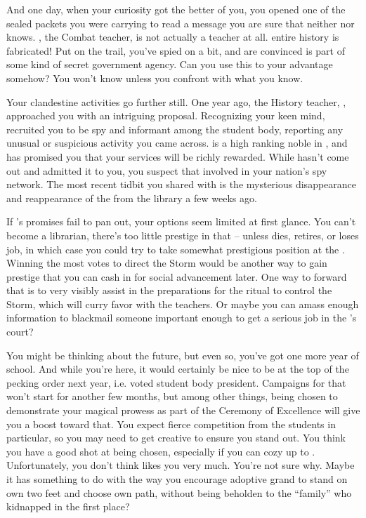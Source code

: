 \documentclass[char]{GL2020}
\begin{document}
And one day, when your curiosity got the better of you, you opened one of the sealed packets you were carrying to read a message you are sure that neither \cEthics{} nor \cChupSecond{} knows. \cInterpol{\full}, the Combat teacher, is not actually a teacher at all. \cInterpol{\Their} entire history is fabricated! Put on the trail, you've spied on \cInterpol{} a bit, and are convinced \cInterpol{} is part of some kind of secret government agency. Can you use this to your advantage somehow? You won't know unless you confront \cInterpol{\them} with what you know.

Your clandestine activities go further still. One year ago, the History teacher, \cHistory{\full}, approached you with an intriguing proposal. Recognizing your keen mind, \cHistory{\they} recruited you to be \cHistory{\their} spy and informant among the student body, reporting any unusual or suspicious activity you came across. \cHistory{} is a high ranking noble in \pFarm{}, and has promised you that your services will be richly rewarded. While \cHistory{\they} hasn't come out and admitted it to you, you suspect that \cHistory{\theyare} involved in your nation's spy network. The most recent tidbit you shared with \cHistory{\them} is the mysterious disappearance and reappearance of the \iScythe{} from the library a few weeks ago.

If \cHistory{}'s promises fail to pan out, your options seem limited at first glance. You can't become a librarian, there's too little prestige in that -- unless \cLibrarian{} dies, retires, or loses \cLibrarian{\their} job, in which case you could try to take \cLibrarian{\their} somewhat prestigious position at the \pSc{}. Winning the most votes to direct the Storm would be another way to gain prestige that you can cash in for social advancement later. One way to forward that is to very visibly assist in the preparations for the ritual to control the Storm, which will curry favor with the teachers. Or maybe you can amass enough information to blackmail someone important enough to get a serious job in the \cQueen{\Majesty}'s court? 

You might be thinking about the future, but even so, you've got one more year of school. And while you're here, it would certainly be nice to be at the top of the pecking order next year, i.e. voted student body president. Campaigns for that won't start for another few months, but among other things, being chosen to demonstrate your magical prowess as part of the Ceremony of Excellence will give you a boost toward that. You expect fierce competition from the \pTech{} students in particular, so you may need to get creative to ensure you stand out. You think you have a good shot at being chosen, especially if you can cozy up to \cMusic{\full}. Unfortunately, you don't think \cMusic{} likes you very much. You're not sure why. Maybe it has something to do with the way you encourage \cMusic{\their} adoptive grand\cAdopted{\nibling} \cAdopted{} to stand on \cAdopted{\their} own two feet and choose \cAdopted{\their} own path, without being beholden to the ``family'' who kidnapped \cAdopted{\them} in the first place?
\end{document}
